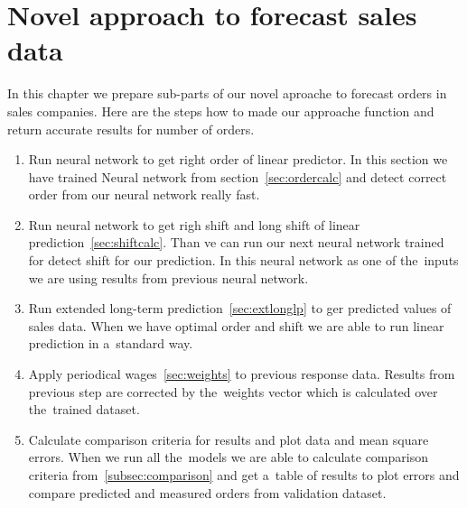     \section{Novel approach to forecast sales data}\label{subsec:combining_models}
    In this chapter we prepare sub-parts of our novel aproache to forecast orders in sales companies.
    Here are the steps how to made our approache function and return accurate results for number of orders.
    \begin{enumerate}
        \item Run neural network to get right order of linear predictor. In this section we have trained Neural network from section~\ref{sec:ordercalc} and detect correct order from our neural network really fast.
        \item Run neural network to get righ shift and long shift of linear prediction~\ref{sec:shiftcalc}.
        Than ve can run our next neural network trained for detect shift for our prediction. In this neural network as one of the~inputs we are using results from previous neural network.
        \item Run extended long-term prediction~\ref{sec:extlonglp} to ger predicted values of sales data.
        When we have optimal order and shift we are able to run linear prediction in a~standard way.
        \item Apply periodical wages~\ref{sec:weights} to previous response data.
        Results from previous step are corrected by the~weights vector which is calculated over the~trained dataset.
        \item Calculate comparison criteria for results and plot data and mean square errors.
        When we run all the~models we are able to calculate comparison criteria from~\ref{subsec:comparison} and
        get a~table of results to plot errors and compare predicted and measured orders from validation dataset.
    \end{enumerate}

